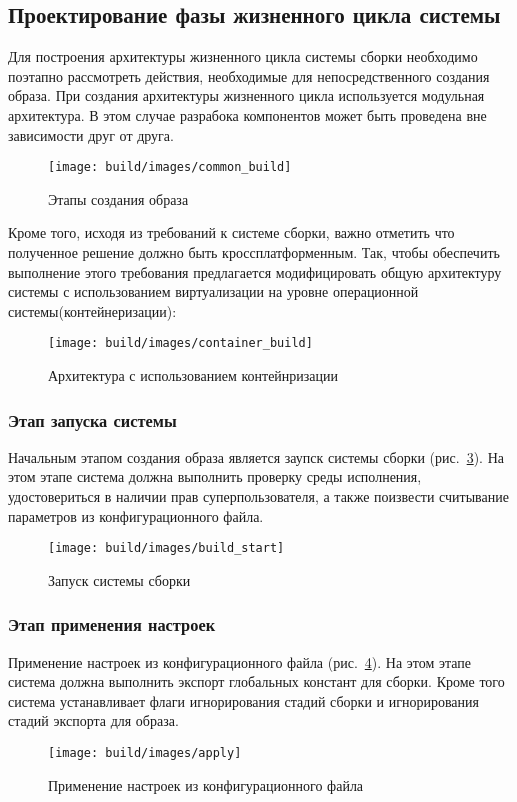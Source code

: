 \newpage
\subsection{Проектирование фазы жизненного цикла системы}
Для построения архитектуры жизненного цикла системы сборки необходимо поэтапно рассмотреть действия, необходимые для непосредственного создания образа.
При создания архитектуры жизненного цикла используется модульная архитектура.
В этом случае разрабока компонентов может быть проведена вне зависимости друг от друга.

\begin{figure}[h!]
  \centering
  \setlength{\fboxsep}{5pt}
  \texttt{[image: build/images/common\_build]}
  \caption{Этапы создания образа}\label{fig: common_build}
\end{figure}

Кроме того, исходя из требований к системе сборки, важно отметить что полученное решение должно быть кроссплатформенным.
Так, чтобы обеспечить выполнение этого требования предлагается модифицировать общую архитектуру системы с использованием виртуализации на уровне операционной системы(контейнеризации):

\begin{figure}[h!]
  \centering
  \setlength{\fboxsep}{5pt}
  \texttt{[image: build/images/container\_build]}
  \caption{Архитектура с использованием контейнризации}\label{fig: container_build}
\end{figure}

\newpage
\subsubsection{Этап запуска системы}

Начальным этапом создания образа является заупск системы сборки (рис.~\ref{fig: build_start}).
  На этом этапе система должна выполнить проверку среды исполнения, удостовериться в наличии прав суперпользователя, а также поизвести считывание параметров из конфигурационного файла.
  \begin{figure}[h!]
    \centering
    \setlength{\fboxsep}{5pt}
    \texttt{[image: build/images/build\_start]}
    \caption{Запуск системы сборки}\label{fig: build_start}
  \end{figure}

\newpage
\subsubsection{Этап применения настроек}
Применение настроек из конфигурационного файла (рис.~\ref{fig: apply}). На этом этапе система должна выполнить экспорт глобальных констант для сборки.
Кроме того система устанавливает флаги игнорирования стадий сборки и игнорирования стадий экспорта для образа.
\begin{figure}[h!]
  \centering
  \setlength{\fboxsep}{5pt}
  \texttt{[image: build/images/apply]}
  \caption{Применение настроек из конфигурационного файла}\label{fig: apply}
\end{figure}

